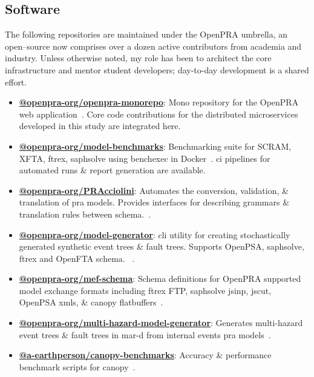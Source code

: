\subsection{Software}
The following repositories are maintained under the OpenPRA umbrella, an open–source now comprises over a dozen active contributors from academia and industry.  Unless otherwise noted, my role has been to architect the core infrastructure and mentor student developers; day-to-day development is a shared effort.

\begin{itemize}
    \item {\textbf{\href{https://github.com/openpra-org/openpra-monorepo}{@openpra-org/openpra-monorepo}}: Mono repository for the OpenPRA web application~\cite{openpra_initiative_openpra_2024}}. Core code contributions for the distributed microservices developed in this study are integrated here.
    
    \item {\textbf{\href{https://github.com/openpra-org/model-benchmarks}{@openpra-org/model-benchmarks}}: Benchmarking suite for SCRAM, XFTA, \acrshort{ftrex}, \acrshort{saphsolve} using benchexec in Docker~\cite{earthperson_pra_2025}}. \acrlong{ci} pipelines for automated runs \& report generation are available.

    \item {\textbf{\href{https://github.com/openpra-org/PRAcciolini}{@openpra-org/PRAcciolini}}: Automates the conversion, validation, \& translation of \acrshort{pra} models. Provides interfaces for describing grammars \& translation rules between schema.~\cite{earthperson_pracciolini_2024}}.
    
    \item {\textbf{\href{https://github.com/openpra-org/model-generator}{@openpra-org/model-generator}}: \acrshort{cli} utility for creating stochastically generated synthetic event trees \& fault trees. Supports OpenPSA, \acrshort{saphsolve}, \acrshort{ftrex} and OpenFTA schema. ~\cite{earthperson_pra_2022}}.
    
    \item {\textbf{\href{https://github.com/openpra-org/mef-schema}{@openpra-org/mef-schema}}: Schema definitions for OpenPRA supported model exchange formats including \acrshort{ftrex} FTP, \acrshort{saphsolve} \acrshort{jsinp}, \acrshort{jscut}, OpenPSA \acrshort{xml}s, \& canopy flatbuffers~\cite{earthperson_pra_2024}}.
    
    \item {\textbf{\href{https://github.com/openpra-org/multi-hazard-model-generator}{@openpra-org/multi-hazard-model-generator}}: Generates multi-hazard event trees \& fault trees in \acrshort{mar-d} from internal events \acrshort{pra} models~\cite{batikh_multi_2023}}.
    
    \item {\textbf{\href{https://github.com/a-earthperson/canopy-benchmarks}{@a-earthperson/canopy-benchmarks}}: Accuracy \& performance benchmark scripts for canopy~\cite{earthperson_canopy_2025}}.
\end{itemize}